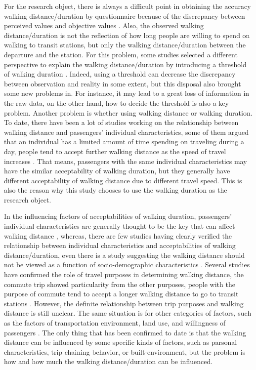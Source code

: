 \documentclass[Journal,letterpaper]{ascelike-new}
\begin{document}
%
For the research object, there is always a difficult point in obtaining the accuracy walking distance/duration by questionnaire because of the discrepancy between perceived values and objective values \cite{BadlandHannahMandSchofieldGrantMandSchluter2007,McCormack2008}. Also, the observed walking distance/duration is not the reflection of how long people are willing to spend on walking to transit stations, but only the walking distance/duration between the departure and the station. For this problem, some studies selected a different perspective to explain the walking distance/duration by introducing a threshold of walking duration \cite{Besser2005,McCormack2008}. Indeed, using a threshold can decrease the discrepancy between observation and reality in some extent, but this disposal also brought some new problems in. For instance, it may lead to a great loss of information in the raw data, on the other hand, how to decide the threshold is also a key problem. Another problem is whether using walking distance or walking duration. To date, there have been a lot of studies working on the relationship between walking distance and passengers' individual characteristics, some of them argued that an individual has a limited amount of time spending on traveling during a day, people tend to accept further walking distance as the speed of travel increases \cite{Marchetti1994,Larsen2010}. That means, passengers with the same individual characteristics may have the similar acceptability of walking duration, but they generally have different acceptability of walking distance due to different travel speed. This is also the reason why this study chooses to use the walking duration as the research object.

%
In the influencing factors of acceptabilities of walking duration, passengers' individual characteristics are generally thought to be the key that can affect walking distance \cite{Besser2005,WeinsteinAgrawal2008,Krygsman2004,Yang2012,Daniels2013,Guerra2012}, whereas, there are few studies having clearly verified the relationship between individual characteristics and acceptabilities of walking distance/duration, even there is a study suggesting the walking distance should not be viewed as a function of socio-demographic characteristics \cite{Krygsman2004}. Several studies have confirmed the role of travel purposes in determining walking distance, the commute trip showed particularity from the other purposes, people with the purpose of commute tend to accept a longer walking distance to go to transit stations \cite{Larsen2010}. However, the definite relationship between trip purposes and walking distance is still unclear. The same situation is for other categories of factors, such as the factors of transportation environment, land use, and willingness of passengers \cite{Guerra2012,Krygsman2004,WeinsteinAgrawal2008}. The only thing that has been confirmed to date is that the walking distance can be influenced by some specific kinds of factors, such as parsonal characteristics, trip chaining behavior, or built-environment, but the problem is how and how much the walking distance/duration can be influenced. 
\end{document}
